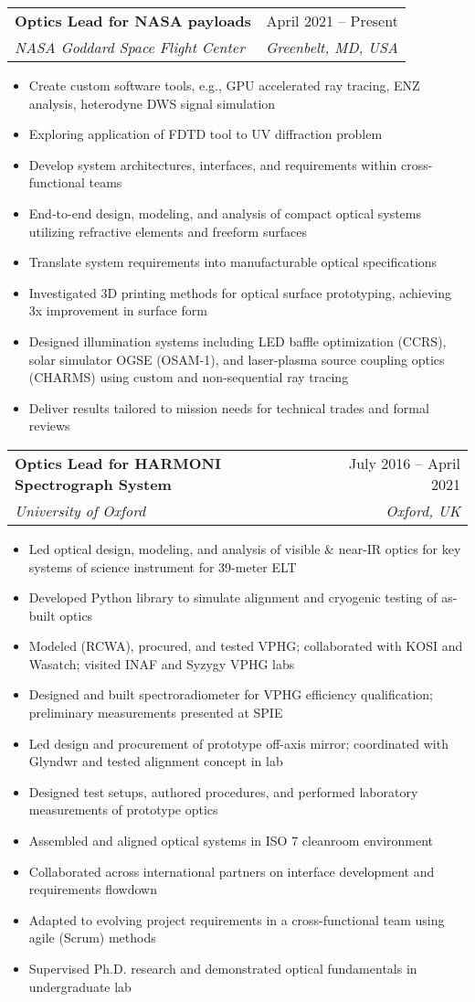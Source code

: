 \documentclass[letterpaper,11pt]{article}
\makeatletter
\newcommand{\resumeItem}[1]{
  \item\small{
    {#1 \vspace{-2pt}}
  }
}
\newcommand{\resumeSubheading}[4]{
  \vspace{-2pt}\item
    \begin{tabular*}{0.97\textwidth}[t]{l@{\extracolsep{\fill}}r}
      \textbf{#1} & #2 \\
      \textit{\small#3} & \textit{\small #4} \\
    \end{tabular*}\vspace{-7pt}
}
\newcommand{\resumeItemListStart}{\begin{itemize}}
\newcommand{\resumeItemListEnd}{\end{itemize}\vspace{-5pt}}
\makeatother
\begin{document}
    \resumeSubheading
      {Optics Lead for NASA payloads}{April 2021 -- Present}
      {NASA Goddard Space Flight Center}{Greenbelt, MD, USA}
      \resumeItemListStart
        \resumeItem{Create custom software tools, e.g., GPU accelerated ray tracing, ENZ analysis, heterodyne DWS signal simulation}
        \resumeItem{Exploring application of FDTD tool to UV diffraction problem}
        \resumeItem{Develop system architectures, interfaces, and requirements within cross-functional teams}
        \resumeItem{End-to-end design, modeling, and analysis of compact optical systems utilizing refractive elements and freeform surfaces}
        \resumeItem{Translate system requirements into manufacturable optical specifications}
        \resumeItem{Investigated 3D printing methods for optical surface prototyping, achieving 3x improvement in surface form}
        \resumeItem{Designed illumination systems including LED baffle optimization (CCRS), solar simulator OGSE (OSAM-1), and laser-plasma source coupling optics (CHARMS) using custom and non-sequential ray tracing}
        \resumeItem{Deliver results tailored to mission needs for technical trades and formal reviews}
      \resumeItemListEnd

    \resumeSubheading
      {Optics Lead for HARMONI Spectrograph System}{July 2016 -- April 2021}
      {University of Oxford}{Oxford, UK}
      \resumeItemListStart
        \resumeItem{Led optical design, modeling, and analysis of visible \& near-IR optics for key systems of science instrument for 39-meter ELT}
        \resumeItem{Developed Python library to simulate alignment and cryogenic testing of as-built optics}
        \resumeItem{Modeled (RCWA), procured, and tested VPHG; collaborated with KOSI and Wasatch; visited INAF and Syzygy VPHG labs}
        \resumeItem{Designed and built spectroradiometer for VPHG efficiency qualification; preliminary measurements presented at SPIE}
        \resumeItem{Led design and procurement of prototype off-axis mirror; coordinated with Glyndwr and tested alignment concept in lab}
        \resumeItem{Designed test setups, authored procedures, and performed laboratory measurements of prototype optics}
        \resumeItem{Assembled and aligned optical systems in ISO 7 cleanroom environment}
        \resumeItem{Collaborated across international partners on interface development and requirements flowdown}
        \resumeItem{Adapted to evolving project requirements in a cross-functional team using agile (Scrum) methods}
        \resumeItem{Supervised Ph.D. research and demonstrated optical fundamentals in undergraduate lab}
      \resumeItemListEnd
\end{document}
